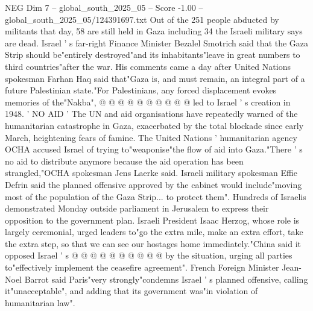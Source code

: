 \begin{textsample}{NEG Dim 7 – global\_south\_2025\_05 – Score -1.00 – global\_south\_2025\_05/124391697.txt}
Out of the 251 people abducted by militants that day, 58 are still held in Gaza including 34 the Israeli military says are dead.
Israel ' s far-right Finance Minister Bezalel Smotrich said that the Gaza Strip should be"entirely destroyed"and its inhabitants"leave in great numbers to third countries"after the war.
His comments came a day after United Nations spokesman Farhan Haq said that"Gaza is, and must remain, an integral part of a future Palestinian state."For Palestinians, any forced displacement evokes memories of the"Nakba", @ @ @ @ @ @ @ @ @ @ led to Israel ' s creation in 1948. ' NO AID ' The UN and aid organisations have repeatedly warned of the humanitarian catastrophe in Gaza, exacerbated by the total blockade since early March, heightening fears of famine.
The United Nations ' humanitarian agency OCHA accused Israel of trying to"weaponise"the flow of aid into Gaza."There ' s no aid to distribute anymore because the aid operation has been strangled,"OCHA spokesman Jens Laerke said.
Israeli military spokesman Effie Defrin said the planned offensive approved by the cabinet would include"moving most of the population of the Gaza Strip... to protect them".
Hundreds of Israelis demonstrated Monday outside parliament in Jerusalem to express their opposition to the government plan.
Israeli President Isaac Herzog, whose role is largely ceremonial, urged leaders to"go the extra mile, make an extra effort, take the extra step, so that we can see our hostages home immediately."China said it opposed Israel ' s @ @ @ @ @ @ @ @ @ @ by the situation, urging all parties to"effectively implement the ceasefire agreement".
French Foreign Minister Jean-Noel Barrot said Paris"very strongly"condemns Israel ' s planned offensive, calling it"unacceptable", and adding that its government was"in violation of humanitarian law".

\end{textsample}
